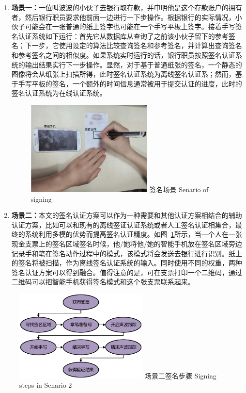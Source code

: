\begin{enumerate}[label=(\arabic*)]
\item \textbf{场景一：}一位叫波波的小伙子去银行取存款，并申明他是这个存款账户的拥有者，然后银行职员要求他前面一边进行一下步操作。根据银行的实际情况，小伙子可能会在一张普通的纸上签字也可能在一个手写平板上签字。接着手写签名认证系统如下运行：首先它从数据库从查询了之前该小伙子留下的参考签名；下一步，它使用设定的算法比较查询签名和参考签名，并计算出查询签名和参考签名之间的相似度。如果系统实时运行的话，银行职员按照签名认证系统的输出结果实行下一步操作。显然，对于基于普通纸张的签名，一个静态的图像将会从纸张上扫描所得，此时签名认证系统为离线签名认证系；然而，基于手写平板的签名，一个额外的时间信息通常被用于提交认证的进度，此时的签名认证系统为在线认证系统。

\begin{figure}[!htp]
  \centering
  \includegraphics[width=0.6\textwidth]{figure/acoustic-senario.pdf}
  \bicaption
    {签名场景}
    {Senario of signing}
  \label{fig:sign-senario}
\end{figure}

\item  \textbf{场景二：}本文的签名认证方案可以作为一种需要和其他认证方案相结合的辅助认证方案，比如可以和现有的离线签证认证系统或者人工签名认证相集合，最终的系统利用多模的优势而提高签名认证精度。如图~\ref{fig:sign-senario}所示，当一个人在一张现金支票上的签名区域签名时候，他/她将他/她的智能手机放在签名区域旁边记录手和笔在签名动作过程中的模式，该模式将会发送去银行进行识别。纸上的签名将被扫描，作为离线签名认证系统的输入。同时使用不同的权重，两种签名认证方案可以得到融合。值得注意的是，可在支票打印一个二维码，通过二维码可以把智能手机获得签名模式和这个张支票联系起来。
\end{enumerate}

\begin{figure}[!htp]
  \centering
  \includegraphics[width=0.6\textwidth]{figure/senario-actions}
  \bicaption
    {场景二签名步骤}
    {Signing steps in Senario 2}
  \label{fig:signing-steps}
\end{figure}

